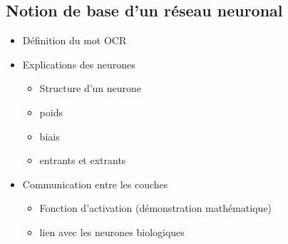 \documentclass[letterpaper,10pt,french]{sphinxmanual}
\begin{document}
\subsection{Notion de base d’un réseau neuronal}
\label{\detokenize{plan:notion-de-base-d-un-reseau-neuronal}}\begin{itemize}
\item {} 
Définition du mot OCR

\item {} 
Explications des neurones
\begin{itemize}
\item {} 
Structure d’un neurone

\item {} 
poids

\item {} 
biais

\item {} 
entrants et extrants

\end{itemize}

\item {} 
Communication entre les couches
\begin{itemize}
\item {} 
Fonction d’activation (démonstration mathématique)

\item {} 
lien avec les neurones biologiques

\end{itemize}

\end{itemize}
\end{document}
